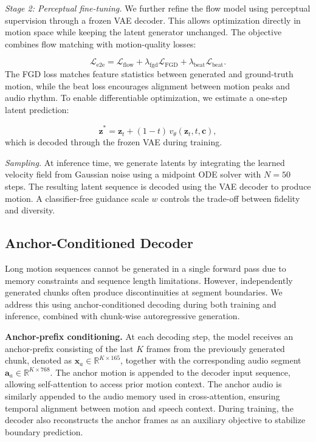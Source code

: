 \noindent \emph{Stage 2: Perceptual fine-tuning.}
We further refine the flow model using perceptual supervision through a frozen VAE decoder.
This allows optimization directly in motion space while keeping the latent generator unchanged.
The objective combines flow matching with motion-quality losses:

\begin{equation}
\mathcal{L}_\text{e2e} =
\mathcal{L}_\text{flow}
+ \lambda_\text{fgd} \mathcal{L}_\text{FGD}
+ \lambda_\text{beat} \mathcal{L}_\text{beat}.
\end{equation}
The FGD loss matches feature statistics between generated and ground-truth motion, while the beat loss encourages alignment between motion peaks and audio rhythm.
To enable differentiable optimization, we estimate a one-step latent prediction:

\begin{equation}
    \hat{\mathbf{z}}^* = \mathbf{z}_t + (1 - t)\, v_\theta(\mathbf{z}_t, t, \mathbf{c}),
\end{equation}
which is decoded through the frozen VAE during training.

\noindent \emph{Sampling.}
At inference time, we generate latents by integrating the learned velocity field from Gaussian noise using a midpoint ODE solver with $N=50$ steps.
The resulting latent sequence is decoded using the VAE decoder to produce motion.
A classifier-free guidance scale $w$ controls the trade-off between fidelity and diversity.

\subsection{Anchor-Conditioned Decoder}
\label{sec:autoreg}
Long motion sequences cannot be generated in a single forward pass due to memory constraints and sequence length limitations.
However, independently generated chunks often produce discontinuities at segment boundaries.
We address this using anchor-conditioned decoding during both training and inference, combined with chunk-wise autoregressive generation.

\noindent \textbf{Anchor-prefix conditioning.}
At each decoding step, the model receives an anchor-prefix consisting of the last $K$ frames from the previously generated chunk, denoted as $\mathbf{x}_a \in \mathbb{R}^{K \times 165}$, together with the corresponding audio segment $\mathbf{a}_a \in \mathbb{R}^{K \times 768}$.
The anchor motion is appended to the decoder input sequence, allowing self-attention to access prior motion context.
The anchor audio is similarly appended to the audio memory used in cross-attention, ensuring temporal alignment between motion and speech context.
During training, the decoder also reconstructs the anchor frames as an auxiliary objective to stabilize boundary prediction.

